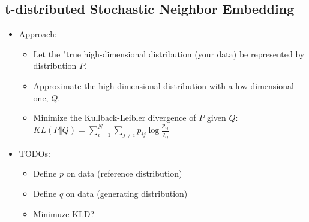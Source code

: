 \documentclass[10pt]{article}
\begin{document}
\subsection*{t-distributed Stochastic Neighbor Embedding}
\begin{itemize}
    \item Approach:
    \begin{itemize}
        \item Let the "true high-dimensional distribution (your data) be represented by distribution $P$.
        \item Approximate the high-dimensional distribution with a low-dimensional one, $Q$.
        \item Minimize the Kullback-Leibler divergence of $P$ given $Q$: $KL(P \Vert Q) = \sum_{i=1}^N \sum_{j \neq i} p_{ij} \log \frac{p_{ij}}{q_{ij}}$
    \end{itemize}
    \item TODOs:
    \begin{itemize}
        \item Define $p$ on data (reference distribution)
        \item Define $q$ on data (generating distribution)
        \item Minimuze KLD?
    \end{itemize}
\end{itemize}
\end{document}
